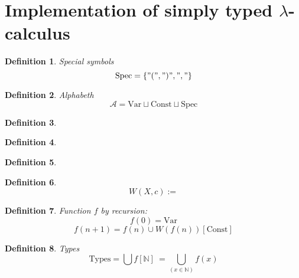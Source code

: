 \documentclass[10pt,a4paper]{article}
\newtheorem{definition}{Definition}
\newcommand{\Var}{\mbox{Var}}
\newcommand{\Const}{\mbox{Const}}
\newcommand{\Spec}{\mbox{Spec}}
\newcommand{\Types}{\mbox{Types}}
\newcommand{\Nat}{\mathbb{N}}
\begin{document}
\section{Implementation of simply typed $\lambda$-calculus}
\begin{definition} Special symbols 
\[ \Spec = \{"(",")",","\} \]
\end{definition}

\begin{definition}
Alphabeth \[ \mathcal{A} = \Var\sqcup\Const\sqcup\Spec \]
\end{definition}
\begin{definition}
\end{definition}
\begin{definition}
\end{definition}
\begin{definition}

\end{definition}
\begin{definition}
\[W(X,c):= \]
\end{definition}
\begin{definition}
Function $f$ by recursion:
\[f(0) = \Var\]
\[f(n+1) = f(n)\cup W(f(n))[\Const]\]
\end{definition}
\begin{definition}
Types
\[\Types = \bigcup f[\Nat] \ = \bigcup_{(x\in\Nat)}f(x) \]
\end{definition}
\end{document}
